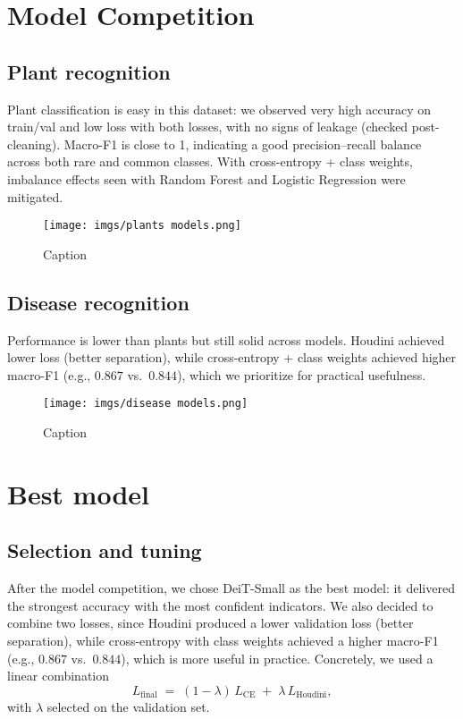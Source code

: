 \documentclass{article}
\begin{document}
\section{Model Competition}
\subsection{Plant recognition}
Plant classification is easy in this dataset: we observed very high accuracy on train/val and low loss with both losses, with no signs of leakage (checked post-cleaning). Macro-F1 is close to 1, indicating a good precision–recall balance across both rare and common classes. With cross-entropy + class weights, imbalance effects seen with Random Forest and Logistic Regression were mitigated.

\begin{figure}[H]
    \centering
    \texttt{[image: imgs/plants models.png]}
    \caption{Caption}
    \label{fig:placeholder}
\end{figure}

\subsection{Disease recognition}
Performance is lower than plants but still solid across models. Houdini achieved lower loss (better separation), while cross-entropy + class weights achieved higher macro-F1 (e.g., $0.867$ vs.\ $0.844$), which we prioritize for practical usefulness.


\begin{figure}[H]
    \centering
    \texttt{[image: imgs/disease models.png]}
    \caption{Caption}
    \label{fig:placeholder}
\end{figure}

\section{Best model}
\subsection{Selection and tuning}
After the model competition, we chose DeiT-Small as the best model: it delivered the strongest accuracy with the most confident indicators. We also decided to combine two losses, since Houdini produced a lower validation loss (better separation), while cross-entropy with class weights achieved a higher macro-F1 (e.g., $0.867$ vs.\ $0.844$), which is more useful in practice. Concretely, we used a linear combination
\[
L_{\text{final}} \;=\; (1-\lambda)\,L_{\text{CE}} \;+\; \lambda\,L_{\text{Houdini}},
\]
with $\lambda$ selected on the validation set. 
\end{document}
